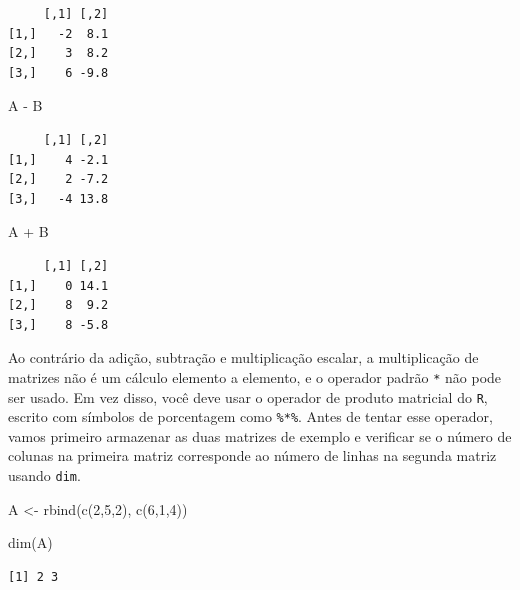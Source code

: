 \documentclass[
  letterpaper,
  DIV=11,
  numbers=noendperiod]{scrreprt}
\newenvironment{Shaded}{\begin{snugshade}}{\end{snugshade}}
\newcommand{\DecValTok}[1]{\textcolor[rgb]{0.68,0.00,0.00}{#1}}
\newcommand{\FunctionTok}[1]{\textcolor[rgb]{0.28,0.35,0.67}{#1}}
\newcommand{\NormalTok}[1]{\textcolor[rgb]{0.00,0.23,0.31}{#1}}
\newcommand{\OtherTok}[1]{\textcolor[rgb]{0.00,0.23,0.31}{#1}}
\newcommand{\SpecialCharTok}[1]{\textcolor[rgb]{0.37,0.37,0.37}{#1}}
\begin{document}
\begin{verbatim}
     [,1] [,2]
[1,]   -2  8.1
[2,]    3  8.2
[3,]    6 -9.8
\end{verbatim}

\begin{Shaded}
\begin{Highlighting}[]
\NormalTok{A }\SpecialCharTok{{-}}\NormalTok{ B}
\end{Highlighting}
\end{Shaded}

\begin{verbatim}
     [,1] [,2]
[1,]    4 -2.1
[2,]    2 -7.2
[3,]   -4 13.8
\end{verbatim}

\begin{Shaded}
\begin{Highlighting}[]
\NormalTok{A }\SpecialCharTok{+}\NormalTok{ B }
\end{Highlighting}
\end{Shaded}

\begin{verbatim}
     [,1] [,2]
[1,]    0 14.1
[2,]    8  9.2
[3,]    8 -5.8
\end{verbatim}

Ao contrário da adição, subtração e multiplicação escalar, a
multiplicação de matrizes não é um cálculo elemento a elemento, e o
operador padrão \texttt{*} não pode ser usado. Em vez disso, você deve
usar o operador de produto matricial do \texttt{R}, escrito com símbolos
de porcentagem como \texttt{\%*\%}. Antes de tentar esse operador, vamos
primeiro armazenar as duas matrizes de exemplo e verificar se o número
de colunas na primeira matriz corresponde ao número de linhas na segunda
matriz usando \texttt{dim}.

\begin{Shaded}
\begin{Highlighting}[]
\NormalTok{A }\OtherTok{\textless{}{-}} \FunctionTok{rbind}\NormalTok{(}\FunctionTok{c}\NormalTok{(}\DecValTok{2}\NormalTok{,}\DecValTok{5}\NormalTok{,}\DecValTok{2}\NormalTok{), }\FunctionTok{c}\NormalTok{(}\DecValTok{6}\NormalTok{,}\DecValTok{1}\NormalTok{,}\DecValTok{4}\NormalTok{))}

\FunctionTok{dim}\NormalTok{(A)}
\end{Highlighting}
\end{Shaded}

\begin{verbatim}
[1] 2 3
\end{verbatim}
\end{document}
